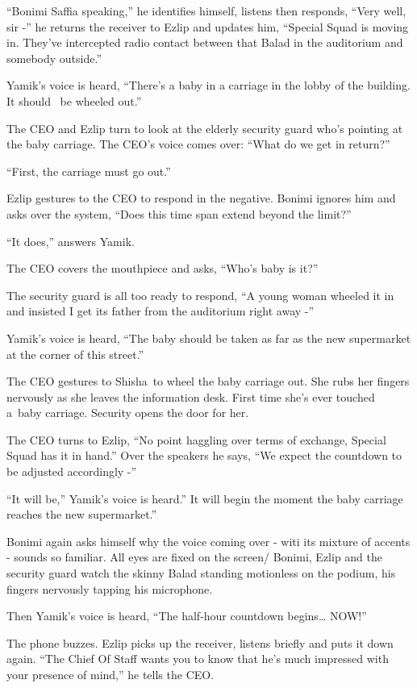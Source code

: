 \documentclass[twoside,11pt]{book}
\begin{document}
``Bonimi Saffia speaking,'' he identifies himself, listens then responds, ``Very
well, sir -'' he returns the receiver to Ezlip and updates him, ``Special Squad is moving in.
They've intercepted radio contact between that Balad in the auditorium and somebody outside.''

Yamik's voice is heard, ``There's a baby in a carriage in the lobby of the building. It should \ be wheeled
out.''

The CEO and Ezlip turn to look at the elderly security{ }guard who's pointing at
the baby carriage. The CEO's voice comes over: ``What do we get in return?''

``First, the carriage must go out.''

Ezlip gestures to the CEO to respond in the negative. Bonimi ignores him and asks over the system, ``Does
this time span extend beyond the limit?''

``It does,'' answers Yamik{.}

The CEO covers the mouthpiece and asks, ``Who's baby is it?''

The security guard is all too ready to respond, ``A young{ }woman
wheeled it in and insisted I get its father from the auditorium right away -''

Yamik's voice is heard, ``The baby should be taken as far as the new supermarket at the corner of this
street.''

The CEO gestures to Shisha~to wheel the baby carriage out. She rubs her fingers nervously as she leaves the information
desk. First time she's ever touched a~baby carriage. Security opens the door for her.

The CEO turns to Ezlip, ``No point haggling over terms of exchange, Special Squad has it in
hand.'' Over the speakers he says, ``We expect the countdown to be adjusted accordingly
-''

``It will be,'' Yamik's voice is heard.'' It will begin the moment the baby
carriage reaches{ }the new supermarket.''

Bonimi again asks himself why the voice coming over - witi its mixture of accents - sounds
so{ }familiar. All eyes are fixed on the
screen{/ }Bonimi, Ezlip and the security guard watch the skinny Balad standing
motionless on the podium, his fingers nervously tapping his microphone.

Then Yamik's voice is heard, ``The half-hour countdown
begins{\dots}{ }NOW!''

The phone buzzes. Ezlip picks up the receiver, listens briefly and puts it down again. ``The Chief Of Staff
wants you to know that he's much impressed with your presence of mind,'' he tells the CEO.
\end{document}
